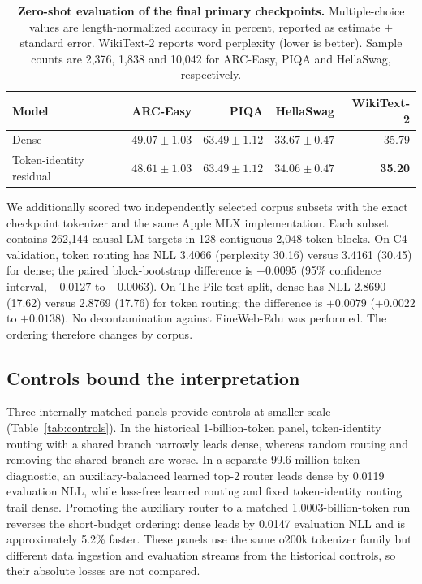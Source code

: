 \documentclass[11pt]{article}
\begin{document}
\begin{table}[t]
\centering
\small
\caption{\textbf{Zero-shot evaluation of the final primary checkpoints.} Multiple-choice values are length-normalized accuracy in percent, reported as estimate $\pm$ standard error. WikiText-2 reports word perplexity (lower is better). Sample counts are 2,376, 1,838 and 10,042 for ARC-Easy, PIQA and HellaSwag, respectively.}
\label{tab:benchmarks}
\begin{tabular}{lrrrr}
\toprule
Model & ARC-Easy & PIQA & HellaSwag & WikiText-2 \\
\midrule
Dense & $\mathbf{49.07\pm1.03}$ & $\mathbf{63.49\pm1.12}$ & $33.67\pm0.47$ & 35.79 \\
Token-identity residual & $48.61\pm1.03$ & $\mathbf{63.49\pm1.12}$ & $\mathbf{34.06\pm0.47}$ & \textbf{35.20} \\
\bottomrule
\end{tabular}
\end{table}

We additionally scored two independently selected corpus subsets with the exact checkpoint tokenizer and the same Apple MLX implementation. Each subset contains 262,144 causal-LM targets in 128 contiguous 2,048-token blocks. On C4 validation\cite{raffel2020exploring}, token routing has NLL 3.4066 (perplexity 30.16) versus 3.4161 (30.45) for dense; the paired block-bootstrap difference is $-0.0095$ (95\% confidence interval, $-0.0127$ to $-0.0063$). On The Pile test split\cite{gao2020pile}, dense has NLL 2.8690 (17.62) versus 2.8769 (17.76) for token routing; the difference is $+0.0079$ ($+0.0022$ to $+0.0138$). No decontamination against FineWeb-Edu was performed. The ordering therefore changes by corpus.

\subsection*{Controls bound the interpretation}

Three internally matched panels provide controls at smaller scale (Table~\ref{tab:controls}). In the historical 1-billion-token panel, token-identity routing with a shared branch narrowly leads dense, whereas random routing and removing the shared branch are worse. In a separate 99.6-million-token diagnostic, an auxiliary-balanced learned top-2 router leads dense by 0.0119 evaluation NLL, while loss-free learned routing and fixed token-identity routing trail dense. Promoting the auxiliary router to a matched 1.0003-billion-token run reverses the short-budget ordering: dense leads by 0.0147 evaluation NLL and is approximately 5.2\% faster. These panels use the same o200k tokenizer family but different data ingestion and evaluation streams from the historical controls, so their absolute losses are not compared.
\end{document}
